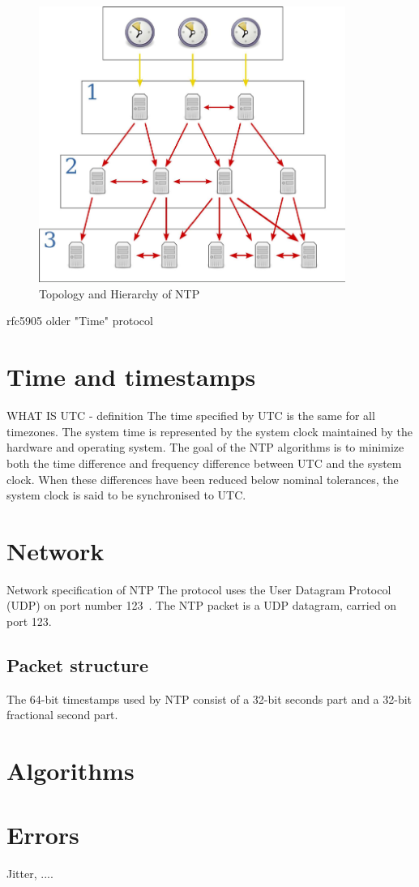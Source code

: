 \begin{figure}
  \centering
  \includegraphics[width=10cm,keepaspectratio]{fig/Network_Time_Protocol_servers_and_clients.pdf}
  \caption{Topology and Hierarchy of NTP}
  \label{fig:ntp-hierarchy}
\end{figure}


\! 
\! rfc5905
\! older "Time" protocol


\section{Time and timestamps}
\!WHAT IS UTC - definition
The time specified by UTC is the same for all timezones.
The system time is represented by the system clock maintained by
the hardware and operating system.
The goal of the NTP algorithms is to minimize
both the time difference and frequency difference between UTC and the system clock.
When these differences have been reduced below nominal
tolerances, the system clock is said to be synchronised to UTC.

\section{Network}\label{sec:ntp-network}
Network specification of NTP 
The protocol uses the User Datagram Protocol (UDP) on port number 123~\cite{ianna-ports}.
The NTP packet is a UDP datagram, carried on port 123.

\subsection{Packet structure}
The 64-bit timestamps used by NTP consist of a 32-bit seconds part and a 32-bit fractional second part.

\section{Algorithms}

\section{Errors}
Jitter, ....
